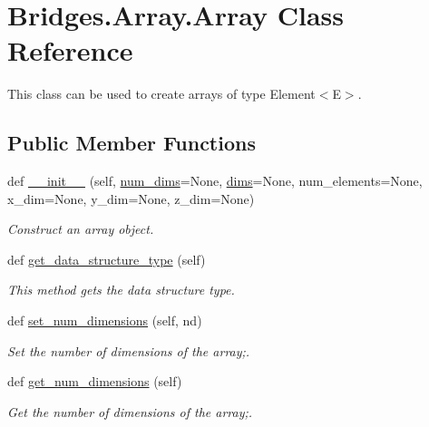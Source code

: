 \hypertarget{class_bridges_1_1_array_1_1_array}{}\section{Bridges.\+Array.\+Array Class Reference}
\label{class_bridges_1_1_array_1_1_array}


This class can be used to create arrays of type Element$<$\+E$>$.  


\subsection*{Public Member Functions}
\begin{DoxyCompactItemize}
\item 
def \mbox{\hyperlink{class_bridges_1_1_array_1_1_array_ad8e23399ea1e3f5bf4cbefdb5d9371be}{\+\_\+\+\_\+init\+\_\+\+\_\+}} (self, \mbox{\hyperlink{class_bridges_1_1_array_1_1_array_a61af14f906e3657866062bef69621445}{num\+\_\+dims}}=None, \mbox{\hyperlink{class_bridges_1_1_array_1_1_array_a309aee1788e19f49aff298155b9b7c39}{dims}}=None, num\+\_\+elements=None, x\+\_\+dim=None, y\+\_\+dim=None, z\+\_\+dim=None)
\begin{DoxyCompactList}\small\item\em Construct an array object. \end{DoxyCompactList}\item 
def \mbox{\hyperlink{class_bridges_1_1_array_1_1_array_a214847a9e90416f2ae0e14a02aa6376f}{get\+\_\+data\+\_\+structure\+\_\+type}} (self)
\begin{DoxyCompactList}\small\item\em This method gets the data structure type. \end{DoxyCompactList}\item 
def \mbox{\hyperlink{class_bridges_1_1_array_1_1_array_ab85706a4fe954ec7620cd19d076a60d1}{set\+\_\+num\+\_\+dimensions}} (self, nd)
\begin{DoxyCompactList}\small\item\em Set the number of dimensions of the array;. \end{DoxyCompactList}\item 
def \mbox{\hyperlink{class_bridges_1_1_array_1_1_array_afa88ea678d74409768912cbb4026b65e}{get\+\_\+num\+\_\+dimensions}} (self)
\begin{DoxyCompactList}\small\item\em Get the number of dimensions of the array;. \end{DoxyCompactList}\item 

\end{DoxyCompactItemize}
